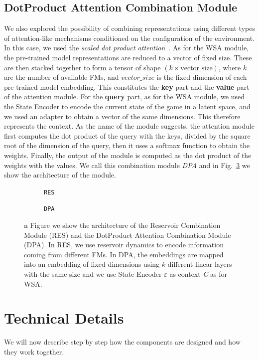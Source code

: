 \subsection{DotProduct Attention Combination Module}
\label{subsec:dpa}

We also explored the possibility of combining representations using different types of attention-like mechanisms conditioned on the configuration of the environment.
In this case, we used the \textit{scaled dot product attention}~\citep{vaswani2017attention}.
As for the WSA module, the pre-trained model representations are reduced to a vector of fixed size.
These are then stacked together to form a tensor of shape $(k \times \text{vector\_size})$, where $k$ are the number of available FMs, and $vector\_size$ is the fixed dimension of each pre-trained model embedding.
This constitutes the \textbf{key} part and the \textbf{value} part of the attention module.
For the \textbf{query} part, as for the WSA module, we used the State Encoder to encode the current state of the game in a latent space, and we used an adapter to obtain a vector of the same dimensions.
This therefore represents the context.
As the name of the module suggests, the attention module first computes the dot product of the query with the keys, divided by the square root of the dimension of the query, then it uses a softmax function to obtain the weights.
Finally, the output of the module is computed as the dot product of the weights with the values.
We call this combination module \textit{DPA} and in Fig.~\ref{fig:dpa_combination} we show the architecture of the module.


\begin{figure}[ht]
    \centering
    \begin{subfigure}[b]{0.47\textwidth}
        \centering
        \fbox{\rule[-.5cm]{0cm}{4cm} \rule[-.5cm]{4cm}{0cm}}
        \caption{\texttt{RES}}
        \label{fig:reservoir_combination}
    \end{subfigure}
    \hfill
    \begin{subfigure}[b]{0.47\textwidth}
        \centering
        \fbox{\rule[-.5cm]{0cm}{4cm} \rule[-.5cm]{4cm}{0cm}}
        \caption{\texttt{DPA}}
        \label{fig:dpa}
    \end{subfigure}

    \caption{n Figure we show the architecture of the Reservoir Combination Module (RES) and the DotProduct Attention Combination Module (DPA). In RES, we use reservoir dynamics to encode information coming from different FMs. In DPA, the embeddings are mapped into an embedding of fixed dimensions using $k$ different linear layers with the same size and we use State Encoder $\varepsilon$ as context \textit{C} as for WSA.}
    \label{fig:dpa_combination}
\end{figure}



\section{Technical Details}\label{sec:technical-details}
We will now describe step by step how the components are designed and how they work together.